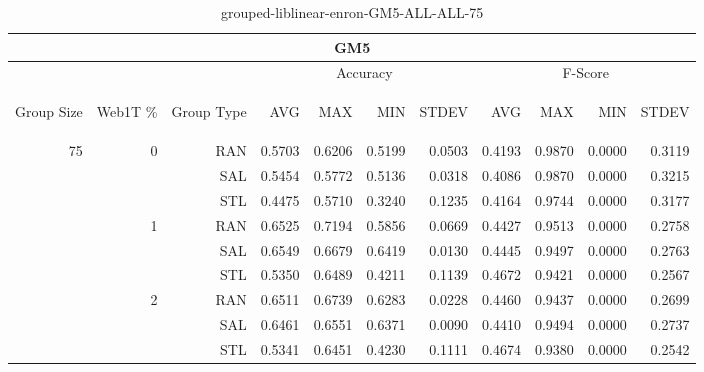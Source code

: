 \begin{center}
\begin{table}[htbp]
\begin{tabular}{ | r | r | r | r | r | r | r | r | r | r | r |}
\hline
\multicolumn{11}{|c|}{GM5}\\
\hline
 & & & \multicolumn{4}{|c|}{Accuracy} & \multicolumn{4}{|c|}{F-Score}\\ \cline{4-11}
\begin{sideways}Group Size\end{sideways} & \begin{sideways}Web1T \%\end{sideways} & \begin{sideways}Group Type\end{sideways} & \begin{sideways}AVG\end{sideways} & \begin{sideways}MAX\end{sideways} & \begin{sideways}MIN\end{sideways} & \begin{sideways}STDEV\end{sideways} & \begin{sideways}AVG\end{sideways} & \begin{sideways}MAX\end{sideways} & \begin{sideways}MIN\end{sideways} & \begin{sideways}STDEV\end{sideways}\\
\hline
\multirow{9}{*}{75}
 & \multirow{3}{*}{0} & RAN & 0.5703 & 0.6206 & 0.5199 & 0.0503 & 0.4193 & 0.9870 & 0.0000 & 0.3119\\ \cline{3-11}
 &   & SAL & 0.5454 & 0.5772 & 0.5136 & 0.0318 & 0.4086 & 0.9870 & 0.0000 & 0.3215\\ \cline{3-11}
 &   & STL & 0.4475 & 0.5710 & 0.3240 & 0.1235 & 0.4164 & 0.9744 & 0.0000 & 0.3177\\ \cline{2-11}
 & \multirow{3}{*}{1} & RAN & 0.6525 & 0.7194 & 0.5856 & 0.0669 & 0.4427 & 0.9513 & 0.0000 & 0.2758\\ \cline{3-11}
 &   & SAL & 0.6549 & 0.6679 & 0.6419 & 0.0130 & 0.4445 & 0.9497 & 0.0000 & 0.2763\\ \cline{3-11}
 &   & STL & 0.5350 & 0.6489 & 0.4211 & 0.1139 & 0.4672 & 0.9421 & 0.0000 & 0.2567\\ \cline{2-11}
 & \multirow{3}{*}{2} & RAN & 0.6511 & 0.6739 & 0.6283 & 0.0228 & 0.4460 & 0.9437 & 0.0000 & 0.2699\\ \cline{3-11}
 &   & SAL & 0.6461 & 0.6551 & 0.6371 & 0.0090 & 0.4410 & 0.9494 & 0.0000 & 0.2737\\ \cline{3-11}
 &   & STL & 0.5341 & 0.6451 & 0.4230 & 0.1111 & 0.4674 & 0.9380 & 0.0000 & 0.2542\\ \cline{2-11}
\hline
\end{tabular}
\caption{grouped-liblinear-enron-GM5-ALL-ALL-75}
\end{table}
\end{center}

